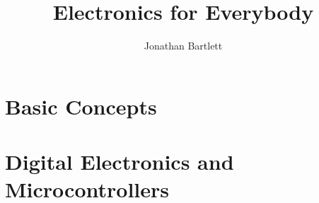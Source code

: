 \documentclass{book}
\begin{document}
\sloppy

\frontmatter

\title{Electronics for Everybody}
\author{Jonathan Bartlett}



\tableofcontents

\mainmatter











\part{Basic Concepts}










\part{Digital Electronics and Microcontrollers}
\end{document}

